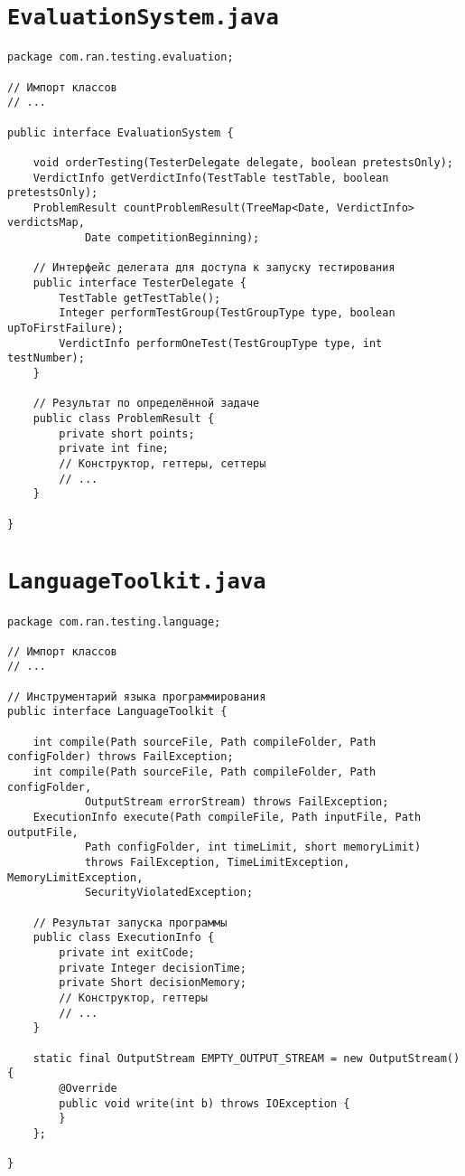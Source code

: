 \section*{\texttt{EvaluationSystem.java}}
\begin{verbatim}
package com.ran.testing.evaluation;

// Импорт классов
// ...

public interface EvaluationSystem {

    void orderTesting(TesterDelegate delegate, boolean pretestsOnly);
    VerdictInfo getVerdictInfo(TestTable testTable, boolean pretestsOnly);
    ProblemResult countProblemResult(TreeMap<Date, VerdictInfo> verdictsMap,
            Date competitionBeginning);

    // Интерфейс делегата для доступа к запуску тестирования
    public interface TesterDelegate {
        TestTable getTestTable();
        Integer performTestGroup(TestGroupType type, boolean upToFirstFailure);
        VerdictInfo performOneTest(TestGroupType type, int testNumber);
    }
    
    // Результат по определённой задаче
    public class ProblemResult {
        private short points;
        private int fine;
        // Конструктор, геттеры, сеттеры
        // ...
    }

}
\end{verbatim}

\section*{\texttt{LanguageToolkit.java}}
\begin{verbatim}
package com.ran.testing.language;

// Импорт классов
// ...

// Инструментарий языка программирования
public interface LanguageToolkit {
    
    int compile(Path sourceFile, Path compileFolder, Path configFolder) throws FailException;
    int compile(Path sourceFile, Path compileFolder, Path configFolder,
            OutputStream errorStream) throws FailException;
    ExecutionInfo execute(Path compileFile, Path inputFile, Path outputFile,
            Path configFolder, int timeLimit, short memoryLimit)
            throws FailException, TimeLimitException, MemoryLimitException,
            SecurityViolatedException;

    // Результат запуска программы
    public class ExecutionInfo {
        private int exitCode;
        private Integer decisionTime;
        private Short decisionMemory;
        // Конструктор, геттеры
        // ...
    }
    
    static final OutputStream EMPTY_OUTPUT_STREAM = new OutputStream() {
        @Override
        public void write(int b) throws IOException {
        }
    };
    
}
\end{verbatim}

